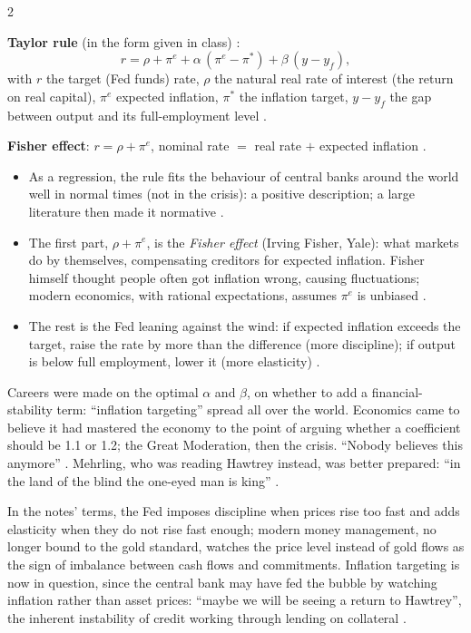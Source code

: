 \begin{paracol}{2}
\begin{keyformulas}
\textbf{Taylor rule} (in the form given in class) :
\[
  r = \rho + \pi^e + \alpha\,(\pi^e - \pi^\ast) + \beta\,(y - y_f),
\]
with $r$ the target (Fed funds) rate, $\rho$ the natural real rate of interest (the return on real capital), $\pi^e$ expected inflation, $\pi^\ast$ the inflation target,
$y-y_f$ the gap between output and its full-employment level .

\medskip
\textbf{Fisher effect}: $r = \rho + \pi^e$, nominal rate $=$ real rate $+$ expected inflation .
\end{keyformulas}

\begin{itemize}
  \item As a regression, the rule fits the behaviour of central banks around the world well in normal times (not in the crisis): a positive description; a large literature
        then made it normative .
  \item The first part, $\rho+\pi^e$, is the \emph{Fisher effect} (Irving Fisher, Yale): what markets do by themselves, compensating creditors for expected inflation. Fisher
        himself thought people often got inflation wrong, causing fluctuations; modern economics, with rational expectations, assumes $\pi^e$ is unbiased
        .
  \item The rest is the Fed leaning against the wind: if expected inflation exceeds the target, raise the rate by more than the difference (more discipline); if output is
        below full employment, lower it (more elasticity) .
\end{itemize}
Careers were made on the optimal $\alpha$ and $\beta$, on whether to add a financial-stability term: ``inflation targeting'' spread all over the world. Economics came to
believe it had mastered the economy to the point of arguing whether a coefficient should be 1.1 or 1.2; the Great Moderation, then the crisis. ``Nobody believes this
anymore'' . Mehrling, who was reading Hawtrey instead, was better prepared: ``in the land of the blind the
one-eyed man is king'' .

In the notes' terms, the Fed imposes discipline when prices rise too fast and adds elasticity when they do not rise fast enough; modern money management, no longer bound to the gold
standard, watches the price level instead of gold flows as the sign of imbalance between cash flows and commitments. Inflation targeting is now in question, since the central bank may have
fed the bubble by watching inflation rather than asset prices: ``maybe we will be seeing a return to Hawtrey'', the inherent instability of credit working through lending on collateral
.


\end{paracol}
